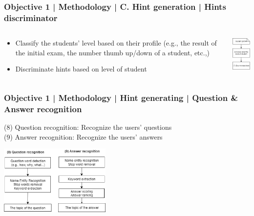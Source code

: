 \documentclass{beamer}
\begin{document}
\begin{frame}
\frametitle{Objective 1 | Methodology | C. Hint generation | Hints discriminator }
\begin{columns}
	
	\begin{column}{.55\textwidth}
		\begin{itemize}
			\item Classify the students' level based on their profile (e.g., the result of the initial exam, the number thumb up/down of a student, etc.,)
			\item Discriminate hints based on level of student
			
		\end{itemize}
		
	\end{column}
	\begin{column}{.35\textwidth}
		\includegraphics[width=18mm]{hd1.png}
	\end{column}
\end{columns}
\end{frame}
\begin{frame}
\frametitle{Objective 1 | Methodology | Hint generating | Question \& Answer recognition }
(8) Question recognition: Recognize the users' questions\\
(9) Answer recognition: Recognize the users' answers
\begin{center}
		\includegraphics[width=55mm]{qa3.png}
\end{center}
\end{frame}
	
\end{document}
